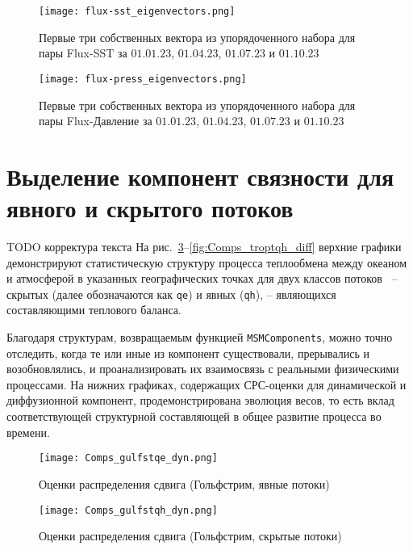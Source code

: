 \begin{figure}
	\centering
	\texttt{[image: flux-sst\_eigenvectors.png]}
	\caption{Первые три собственных вектора из упорядоченного набора для пары Flux-SST за $01.01.23$, $01.04.23$, $01.07.23$ и $01.10.23$}
	\label{fig:Flux-SST_eigenvectors}
\end{figure}

\begin{figure}
	\centering
	\texttt{[image: flux-press\_eigenvectors.png]}
	\caption{Первые три собственных вектора из упорядоченного набора для пары Flux-Давление за $01.01.23$, $01.04.23$, $01.07.23$ и $01.10.23$}
	\label{fig:Flux-press_eigenvectors}
\end{figure}

\section{Выделение компонент связности для явного и скрытого потоков}
TODO корректура текста
На рис.~\ref{fig:Comps_gulfstqe_dyn}--\ref{fig:Comps_troptqh_diff} верхние графики демонстрируют статистическую структуру процесса теплообмена между океаном и атмосферой в указанных географических точках для двух классов потоков~\cite{perry1977ocean} --  скрытых (далее обозначаются как \verb"qe") и явных (\verb"qh"), -- являющихся составляющими теплового баланса.

Благодаря структурам, возвращаемым функцией \verb"MSMComponents", можно точно отследить, когда те или иные из компонент существовали, прерывались и возобновлялись, и проанализировать их взаимосвязь с реальными физическими процессами. На нижних графиках, содержащих СРС-оценки для динамической и диффузионной компонент, продемонстрирована эволюция весов, то есть вклад соответствующей структурной составляющей в общее развитие процесса во времени.

\begin{figure}[!h]
	\centering
	\texttt{[image: Comps\_gulfstqe\_dyn.png]}
	\caption{Оценки распределения сдвига (Гольфстрим, явные потоки)}
	\label{fig:Comps_gulfstqe_dyn}
\end{figure}

\begin{figure}[!h]
	\centering
	\texttt{[image: Comps\_gulfstqh\_dyn.png]}
	\caption{Оценки распределения сдвига (Гольфстрим, скрытые потоки)}
	\label{fig:Comps_gulfstqh_dyn}
\end{figure}

